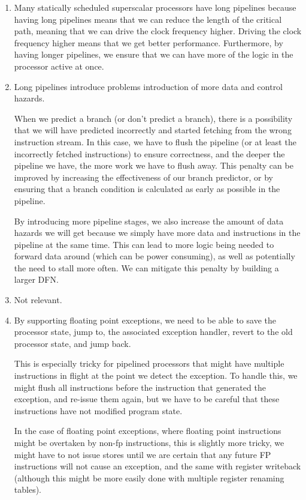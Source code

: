


\begin{enumerate}[label=(\alph*)]

  \item
    Many statically scheduled superscalar processors have long pipelines because having long pipelines means that we can reduce the length of the critical path, meaning that we can drive the clock frequency higher. Driving the clock frequency higher means that we get better performance. Furthermore, by having longer pipelines, we ensure that we can have more of the logic in the processor active at once.

    \item
      Long pipelines introduce problems introduction of more data and control hazards.

      When we predict a branch (or don't predict a branch), there is a possibility that we will have predicted incorrectly and started fetching from the wrong instruction stream. In this case, we have to flush the pipeline (or at least the incorrectly fetched instructions) to ensure correctness, and the deeper the pipeline we have, the more work we have to flush away. This penalty can be improved by increasing the effectiveness of our branch predictor, or by ensuring that a branch condition is calculated as early as possible in the pipeline.

      By introducing more pipeline stages, we also increase the amount of data hazards we will get because we simply have more data and instructions in the pipeline at the same time. This can lead to more logic being needed to forward data around (which can be power consuming), as well as potentially the need to stall more often. We can mitigate this penalty by building a larger DFN.

      \item
        Not relevant.

        \item
          By supporting floating point exceptions, we need to be able to save the processor state, jump to, the associated exception handler, revert to the old processor state, and jump back.

          This is especially tricky for pipelined processors that might have multiple instructions in flight at the point we detect the exception. To handle this, we might flush all instructions before the instruction that generated the exception, and re-issue them again, but we have to be careful that these instructions have not modified program state.

          In the case of floating point exceptions, where floating point instructions might be overtaken by non-fp instructions, this is slightly more tricky, we might have to not issue stores until we are certain that any future FP instructions will not cause an exception, and the same with register writeback (although this might be more easily done with multiple register renaming tables).

        
    \end{enumerate}


